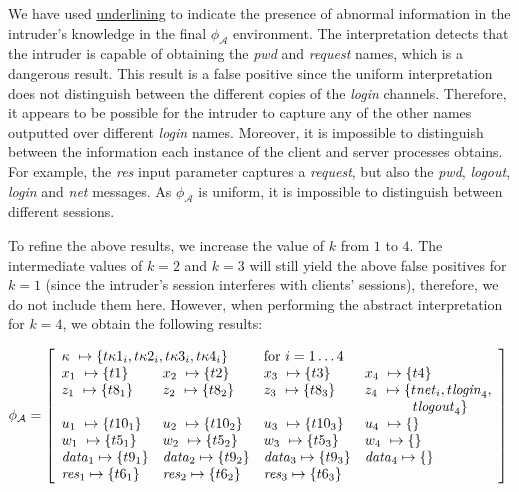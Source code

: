 \documentclass[10pt,a4paper,final,oneside,fleqn]{book}
\begin{document}
\noindent
We have used \underline{underlining} to indicate the presence of abnormal information in the intruder's knowledge in the final $\phi_\mathcal{A}$ environment. The interpretation detects that the intruder is capable of obtaining the {\itshape pwd\/} and {\itshape request\/} names, which is a dangerous result.  This result is a false positive since the uniform interpretation does not distinguish between the different copies of the {\itshape login\/} channels. Therefore, it appears to be possible for the intruder to capture any of the other names outputted over different {\itshape login\/} names. Moreover, it is impossible to distinguish between the information each instance of the client and server processes obtains.  For example, the {\itshape res\/} input parameter captures a {\itshape request\/}, but also the {\itshape pwd\/}, {\itshape logout\/}, {\itshape login\/} and {\itshape net\/} messages.  As $\phi_\mathcal{A}$ is uniform, it is impossible to distinguish between different sessions.

To refine the above results, we increase the value of $k$ from $1$ to $4$.  The intermediate values of $k=2$ and $k=3$ will still yield the above false positives for $k=1$ (since the intruder's session interferes with clients' sessions), therefore, we do not include them here. However, when performing the abstract interpretation for $k=4$, we obtain the following results:\vspace{5mm}

\noindent
$\phi_\mathcal{A}=\left[\begin{array}{llll}
\multicolumn{2}{l}{\kappa~\mapsto\{t\kappa 1_i, t\kappa 2_i, t\kappa 3_i, t\kappa 4_i\}}&\mbox{for }i=1\ldots 4&\\
x_1~\mapsto\{t1\}& x_2~\mapsto\{t2\}&x_3~\mapsto\{t3\}& x_4~\mapsto\{t4\}\\
z_1~\mapsto\{t8_1\}&z_2~\mapsto\{t8_2\}&z_3~\mapsto\{t8_3\}& z_4~\mapsto\{t\mbox{{\itshape net\/}}_i, t\mbox{{\itshape login\/}}_4,\\ &&&\hspace{12mm}t\mbox{{\itshape logout\/}}_4\}\\
u_1~\mapsto\{t10_1\}&u_2~\mapsto\{t10_2\}&u_3~\mapsto\{t10_3\}&u_4~\mapsto\{\}\\w_1~\mapsto\{t5_1\}&w_2~\mapsto\{t5_2\}&w_3~\mapsto\{t5_3\}&w_4~\mapsto\{\}\\
\mbox{{\itshape data\/}}_1\mapsto\{t9_1\}&\mbox{{\itshape data\/}}_2\mapsto\{t9_2\}&\mbox{{\itshape data\/}}_3\mapsto\{t9_3\}&\mbox{{\itshape data\/}}_4\mapsto\{\}\\
\mbox{{\itshape res\/}}_1\mapsto\{t6_1\}&\mbox{{\itshape res\/}}_2\mapsto\{t6_2\}&\mbox{{\itshape res\/}}_3\mapsto\{t6_3\}
\end{array}\right]$\vspace{5mm}
\end{document}
